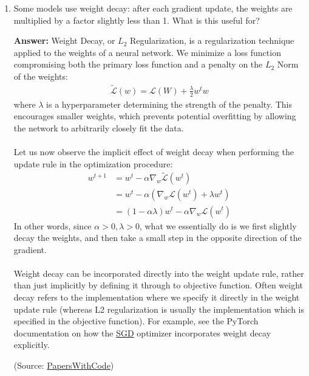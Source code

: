 \documentclass{article}
\newenvironment{QandA}{\begin{enumerate}[label=\arabic*.]}{\end{enumerate}}
\newenvironment{answer}{\par\normalfont \textbf{Answer:}}{}
\begin{document}
\begin{QandA}
    \item Some models use weight decay: after each gradient update, the weights are multiplied by a factor slightly less than 1. What is this useful for?
    \begin{answer}
        Weight Decay, or $L_2$ Regularization, is a regularization technique applied to the weights of a neural network. We minimize a loss function compromising both the primary loss function and a penalty on the $L_2$ Norm of the weights:
        \begin{align*}
            \tilde{\mathcal{L}}(w) = \mathcal{L}(W) + \frac{\lambda}{2} w^t w
        \end{align*}
        where $\lambda$ is a hyperparameter determining the strength of the penalty. This encourages smaller weights, which prevents potential overfitting by allowing the network to arbitrarily closely fit the data. \\\\
        Let us now observe the implicit effect of weight decay when performing the update rule in the optimization procedure:
        \begin{align*}
            w^{t+1} &= w^t - \alpha \nabla_w \tilde{\mathcal{L}}(w^t) \\
            &= w^t - \alpha(\nabla_w \mathcal{L}(w^t) + \lambda w^t) \\
            &= (1 - \alpha \lambda)w^t - \alpha \nabla_w \mathcal{L}(w^t)
        \end{align*}
        In other words, since $\alpha > 0, \lambda > 0$, what we essentially do is we first slightly decay the weights, and then take a small step in the opposite direction of the gradient. \\\\
        Weight decay can be incorporated directly into the weight update rule, rather than just implicitly by defining it through to objective function. Often weight decay refers to the implementation where we specify it directly in the weight update rule (whereas L2 regularization is usually the implementation which is specified in the objective function). For example, see the PyTorch documentation on how the \href{https://pytorch.org/docs/stable/\lagenerated/torch.optim.SGD.html}{SGD} optimizer incorporates weight decay explicitly. 

        (Source: \href{https://paperswithcode.com/method/weight-decay}{PapersWithCode})
    \end{answer}    


\end{QandA}
\end{document}
